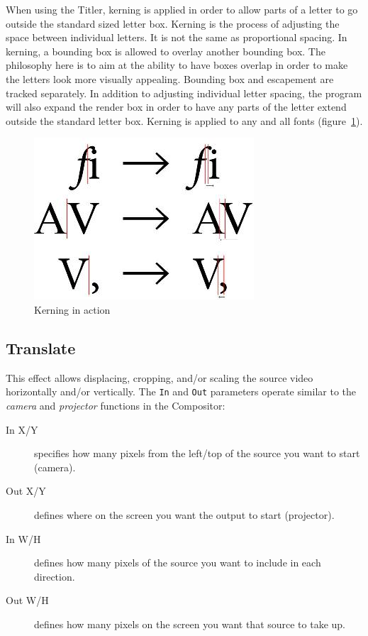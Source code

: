 When using the Titler, kerning is applied in order to allow parts of a letter to go outside the standard sized letter box.  Kerning is the process of adjusting the space between individual letters.  It is not the same as proportional spacing.  In kerning, a bounding box is allowed to overlay another bounding box.  The philosophy here is to aim at the ability to have boxes overlap in order to make the letters look more visually appealing.  Bounding box and escapement are tracked separately.  In addition to adjusting individual letter spacing, the program will also expand the render box in order to have any parts of the letter extend outside the standard letter box.  Kerning is applied to any and all fonts (figure~\ref{fig:title05}).

\begin{figure}[hbtp]
    \centering
    \includegraphics[width=0.5\linewidth]{images/title05.png}
    \caption{Kerning in action}
    \label{fig:title05}
\end{figure}

\subsection{Translate}%
\label{sub:translate}

This effect allows displacing, cropping, and/or scaling the source video horizontally and/or vertically. The \texttt{In} and \texttt{Out} parameters operate similar to the \textit{camera} and \textit{projector} functions in the Compositor:

\begin{description}
    \item[In X/Y] specifies how many pixels from the left/top of the source you want to start (camera).
    \item[Out X/Y] defines where on the screen you want the output to start (projector).
    \item[In W/H] defines how many pixels of the source you want to include in each direction.
    \item[Out W/H] defines how many pixels on the screen you want that source to take up.
\end{description}

